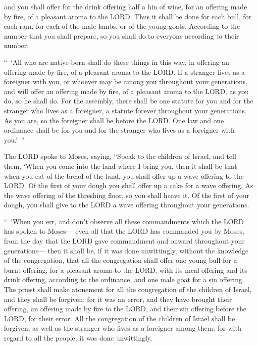 \myverse{}and you shall offer for the drink offering half a hin of wine, for an offering
made by fire, of a pleasant aroma to the LORD.
\myverse{}Thus it shall be done for each bull, for each ram, for each of the male lambs,
or of the young goats.
\myverse{}According to the number that you shall prepare, so you shall do to everyone
according to their number.


\myverse{}“ ‘All who are native-born shall do these things in this way,
in offering an offering made by fire, of a pleasant aroma to the LORD.
\myverse{}If a stranger lives as a foreigner with you, or whoever may be among you
throughout your generations, and will offer an offering made by fire, of a pleasant aroma to the LORD,
as you do, so he shall do.
\myverse{}For the assembly, there shall be one statute for you and for the stranger
who lives as a foreigner, a statute forever throughout your generations. As you are, so the foreigner
shall be before the LORD.
\myverse{}One law and one ordinance shall be for you and for the stranger who lives
as a foreigner with you.’ ”


\myverse{}The LORD spoke to Moses, saying,
\myverse{}“Speak to the children of Israel, and tell them, ‘When you come into the
land where I bring you,
\myverse{}then it shall be that when you eat of the bread of the land, you shall offer
up a wave offering to the LORD.
\myverse{}Of the first of your dough you shall offer up a cake for a wave offering.
As the wave offering of the threshing floor, so you shall heave it.
\myverse{}Of the first of your dough, you shall give to the LORD a wave offering throughout
your generations.


\myverse{}“ ‘When you err, and don’t observe all these commandments which
the LORD has spoken to Moses—
\myverse{}even all that the LORD has commanded you by Moses, from the day that the
LORD gave commandment and onward throughout your generations—
\myverse{}then it shall be, if it was done unwittingly, without the knowledge of the
congregation, that all the congregation shall offer one young bull for a burnt offering, for a pleasant
aroma to the LORD, with its meal offering and its drink offering, according to the ordinance, and one
male goat for a sin offering.
\myverse{}The priest shall make atonement for all the congregation of the children
of Israel, and they shall be forgiven; for it was an error, and they have brought their offering, an offering
made by fire to the LORD, and their sin offering before the LORD, for their error.
\myverse{}All the congregation of the children of Israel shall be forgiven, as well
as the stranger who lives as a foreigner among them; for with regard to all the people, it was done unwittingly.


